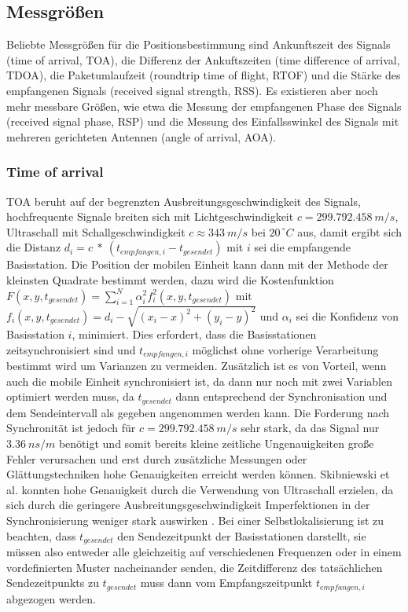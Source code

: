 \subsection{Messgrößen}
Beliebte Messgrößen für die Positionsbestimmung sind Ankunftszeit des Signals (time of arrival, TOA), die Differenz der Ankuftszeiten (time difference of arrival, TDOA), die Paketumlaufzeit (roundtrip time of flight, RTOF) und die Stärke des empfangenen Signals (received signal strength, RSS). Es existieren aber noch mehr messbare Größen, wie etwa die Messung der empfangenen Phase des Signals (received signal phase, RSP) und die Messung des Einfallsswinkel des Signals mit mehreren gerichteten Antennen (angle of arrival, AOA). \\

\subsubsection{Time of arrival}
TOA beruht auf der begrenzten Ausbreitungsgeschwindigkeit des Signals, hochfrequente Signale breiten sich mit Lichtgeschwindigkeit $c = 299.792.458\ m/s$, Ultraschall mit Schallgeschwindigkeit $c \approx 343\ m/s$ bei $20^{\ \circ}C$ aus, damit ergibt sich die Distanz $d_i = c\ *\ (t_{empfangen,i} - t_{gesendet})$ mit $i$ sei die empfangende Basisstation. Die Position der mobilen Einheit kann dann mit der Methode der kleinsten Quadrate bestimmt werden, dazu wird die Kostenfunktion $F(x,y,t_{gesendet}) = \sum_{i=1}^{N} {\alpha}^2_i f^2_i(x,y,t_{gesendet})$ mit $f_i(x,y,t_{gesendet}) = d_i - \sqrt{(x_i - x)^2 + (y_i - y)^2}$ und ${\alpha}_i$ sei die Konfidenz von Basisstation $i$, minimiert. Dies erfordert, dass die Basisstationen zeitsynchronisiert sind und $t_{empfangen,i}$ möglichst ohne vorherige Verarbeitung bestimmt wird um Varianzen zu vermeiden. Zusätzlich ist es von Vorteil, wenn auch die mobile Einheit synchronisiert ist, da dann nur noch mit zwei Variablen optimiert werden muss, da $t_{gesendet}$ dann entsprechend der Synchronisation und dem Sendeintervall als gegeben angenommen werden kann. Die Forderung nach Synchronität ist jedoch für $c = 299.792.458\ m/s$ sehr stark, da das Signal nur $3.36\ ns/m$ benötigt und somit bereits kleine zeitliche Ungenauigkeiten große Fehler verursachen und erst durch zusätzliche Messungen oder Glättungstechniken hohe Genauigkeiten erreicht werden können. Skibniewski et al. konnten hohe Genauigkeit durch die Verwendung von Ultraschall erzielen, da sich durch die geringere Ausbreitungsgeschwindigkeit Imperfektionen in der Synchronisierung weniger stark auswirken \cite{skibniewski2009simulation}. 
Bei einer Selbstlokalisierung ist zu beachten, dass $t_{gesendet}$ den Sendezeitpunkt der Basisstationen darstellt, sie müssen also entweder alle gleichzeitig auf verschiedenen Frequenzen oder in einem vordefinierten Muster nacheinander senden, die Zeitdifferenz des tatsächlichen Sendezeitpunkts zu $t_{gesendet}$ muss dann vom Empfangszeitpunkt $t_{empfangen,i}$ abgezogen werden. \\

